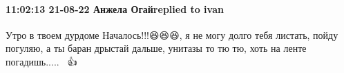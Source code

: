  
 
 
 
 

\paragraph{11:02:13 21-08-22 Анжела Огайreplied to ivan}

Утро в твоем дурдоме Началось!!!😆😆😆, я не могу долго тебя листать, пойду погуляю, а ты баран дрыстай дальше, унитазы то тю тю, хоть на ленте погадишь.....🤣🤣🤣👍
